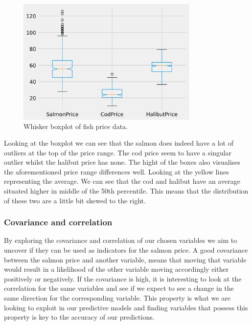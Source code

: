 \begin{figure}[H]
    \centering
    \includegraphics[width=0.8\textwidth]{data/Figures/Descriptive/Whisker.png}
    \caption[Whisker boxplot of fish price data]{Whisker boxplot of fish price data.}\label{fig:Whisker boxplot}
\end{figure}

Looking at the boxplot we can see that the salmon does indeed have a lot of outliers at the top of the price range. The cod price seem to have a singular outlier whilst the halibut price has none. The hight of the boxes also visualises the aforementioned price range differences well. Looking at the yellow lines representing the average. We can see that the cod and halibut have an average situated higher in middle of the 50th percentile. This means that the distribution of these two are a little bit skewed to the right.

\subsubsection{Covariance and correlation}\label{covariance and correlation}
By exploring the covariance and correlation of our chosen variables we aim to uncover if they can be used as indicators for the salmon price. A good covariance between the salmon price and another variable, means that moving that variable would result in a likelihood of the other variable moving accordingly either positively or negatively. If the covariance is high, it is interesting to look at the correlation for the same variables and see if we expect to see a change in the same direction for the corresponding variable. This property is what we are looking to exploit in our predictive models and finding variables that possess this property is key to the accuracy of our predictions.

